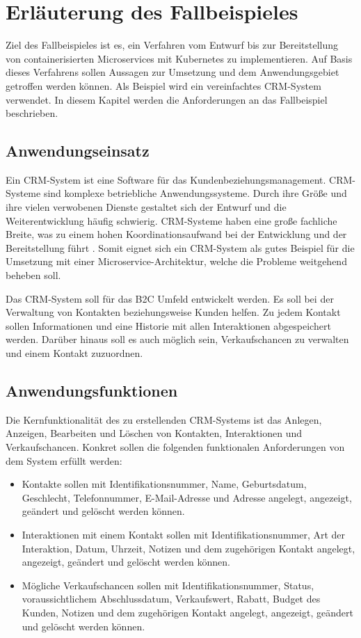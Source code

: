 \section{Erläuterung des Fallbeispieles}
Ziel des Fallbeispieles ist es, ein Verfahren vom Entwurf bis zur Bereitstellung von containerisierten Microservices mit Kubernetes zu implementieren. Auf Basis dieses Verfahrens sollen Aussagen zur Umsetzung und dem Anwendungsgebiet getroffen werden können. Als Beispiel wird ein vereinfachtes \ac{CRM}-System verwendet. In diesem Kapitel werden die Anforderungen an das Fallbeispiel beschrieben.

\subsection{Anwendungseinsatz}
Ein \ac{CRM}-System ist eine Software für das Kundenbeziehungsmanagement. \ac{CRM}-Systeme sind komplexe betriebliche Anwendungssysteme. Durch ihre Größe und ihre vielen verwobenen Dienste gestaltet sich der Entwurf und die Weiterentwicklung häufig schwierig. \ac{CRM}-Systeme haben eine große fachliche Breite, was zu einem hohen Koordinationsaufwand bei der Entwicklung und der Bereitstellung führt \parencite[vgl.][S. 62]{trempArchitekturen2021}. Somit eignet sich ein \ac{CRM}-System als gutes Beispiel für die Umsetzung mit einer Microservice-Architektur, welche die Probleme weitgehend beheben soll. 

Das \ac{CRM}-System soll für das \ac{B2C} Umfeld entwickelt werden. Es soll bei der Verwaltung von Kontakten beziehungsweise Kunden helfen. Zu jedem Kontakt sollen Informationen und eine Historie mit allen Interaktionen abgespeichert werden. Darüber hinaus soll es auch möglich sein, Verkaufschancen zu verwalten und einem Kontakt zuzuordnen.

\subsection{Anwendungsfunktionen}
Die Kernfunktionalität des zu erstellenden \ac{CRM}-Systems ist das Anlegen, Anzeigen, Bearbeiten und Löschen von Kontakten, Interaktionen und Verkaufschancen. Konkret sollen die folgenden funktionalen Anforderungen von dem System erfüllt werden:
\begin{itemize}
\item Kontakte sollen mit Identifikationsnummer, Name, Geburtsdatum, Geschlecht, Telefonnummer, E-Mail-Adresse und Adresse angelegt, angezeigt, geändert und gelöscht werden können.
\item Interaktionen mit einem Kontakt sollen mit Identifikationsnummer, Art der Interaktion, Datum, Uhrzeit, Notizen und dem zugehörigen Kontakt angelegt, angezeigt, geändert und gelöscht werden können.
\item Mögliche Verkaufschancen sollen mit Identifikationsnummer, Status, voraussichtlichem Abschlussdatum, Verkaufswert, Rabatt, Budget des Kunden, Notizen und dem zugehörigen Kontakt angelegt, angezeigt, geändert und gelöscht werden können.
\end{itemize} 

